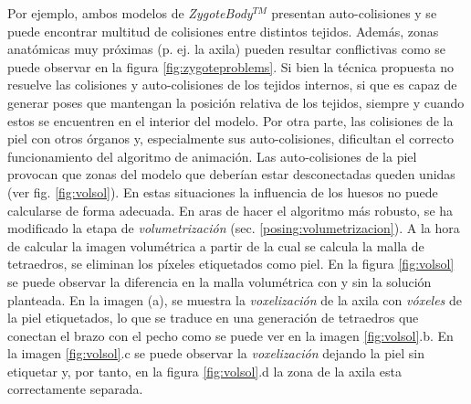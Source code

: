 

Por ejemplo, ambos modelos de \emph{ZygoteBody}$^{TM}$ presentan auto-colisiones y se puede encontrar multitud de colisiones entre distintos tejidos. Además, zonas anatómicas muy próximas (p. ej. la axila) pueden resultar conflictivas como se puede observar en la figura \ref{fig:zygoteproblems}. Si bien la técnica propuesta no resuelve las colisiones y auto-colisiones de los tejidos internos, si que es capaz de generar poses que mantengan la posición relativa de los tejidos, siempre y cuando estos se encuentren en el interior del modelo. Por otra parte, las colisiones de la piel con otros órganos y, especialmente sus auto-colisiones, dificultan el correcto funcionamiento del algoritmo de animación. Las auto-colisiones de la piel provocan que zonas del modelo que deberían estar desconectadas queden unidas (ver fig. \ref{fig:volsol}). En estas situaciones la influencia de los huesos no puede calcularse de forma adecuada. En aras de hacer el algoritmo más robusto, se ha modificado la etapa de \emph{volumetrización} (sec. \ref{posing:volumetrizacion}). A la hora de calcular la imagen volumétrica a partir de la cual se calcula la malla de tetraedros, se eliminan los píxeles etiquetados como piel.
%
En la figura \ref{fig:volsol} se puede observar la diferencia en la malla volumétrica con y sin la solución planteada. En la imagen (a), se muestra la  \emph{voxelización} de la axila con \emph{vóxeles} de la piel etiquetados, lo que se traduce en una generación de tetraedros que conectan el brazo con el pecho como se puede ver en la imagen \ref{fig:volsol}.b. En la imagen \ref{fig:volsol}.c  se puede observar la \emph{voxelización} dejando la piel sin etiquetar y, por tanto, en la figura \ref{fig:volsol}.d la zona de la axila esta correctamente separada.

